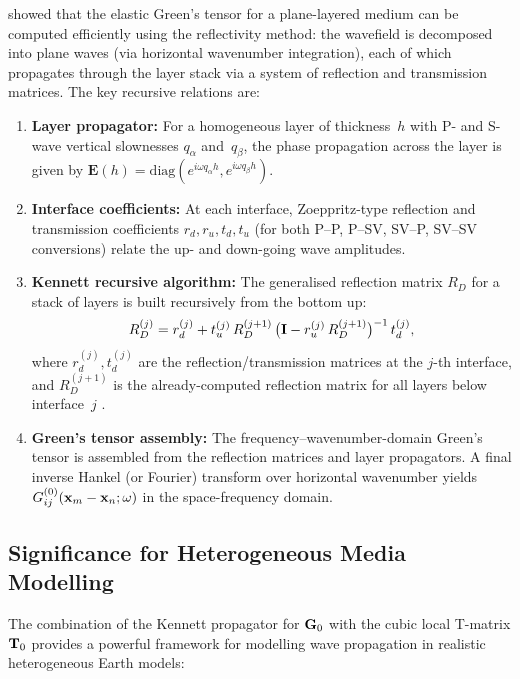 \citet{Kennett1983} showed that the elastic Green's tensor for a
plane-layered medium can be computed efficiently using the reflectivity
method: the wavefield is decomposed into plane waves (via horizontal
wavenumber integration), each of which propagates through the layer stack
via a system of reflection and transmission matrices.  The key recursive
relations are:

\begin{enumerate}
\item \textbf{Layer propagator:}  For a homogeneous layer of thickness~$h$
  with P- and S-wave vertical slownesses $q_\alpha$ and~$q_\beta$, the
  phase propagation across the layer is given by
  $\mathbf{E}(h) = \mathrm{diag}(e^{i\omega q_\alpha h},
  e^{i\omega q_\beta h})$.

\item \textbf{Interface coefficients:}  At each interface, Zoeppritz-type
  reflection and transmission coefficients $r_d, r_u, t_d, t_u$ (for both
  P--P, P--SV, SV--P, SV--SV conversions) relate the up- and down-going
  wave amplitudes.

\item \textbf{Kennett recursive algorithm:}  The generalised reflection
  matrix $R_D$ for a stack of layers is built recursively from the bottom
  up:
\begin{equation}
  R_D^{(j)} = r_d^{(j)}
  + t_u^{(j)}\,R_D^{(j+1)}\,
    \bigl(\mathbf{I} - r_u^{(j)}\,R_D^{(j+1)}\bigr)^{-1}\,t_d^{(j)},
\label{eq:Kennett}
\end{equation}
where $r_d^{(j)}, t_d^{(j)}$ are the reflection/transmission matrices at
the $j$-th interface, and $R_D^{(j+1)}$ is the already-computed reflection
matrix for all layers below interface~$j$ \citep{Kennett1983,Kennett1979}.

\item \textbf{Green's tensor assembly:}  The frequency--wavenumber-domain
  Green's tensor is assembled from the reflection matrices and layer
  propagators.  A final inverse Hankel (or Fourier) transform over
  horizontal wavenumber yields
  $G_{ij}^{(0)}(\mathbf{x}_m-\mathbf{x}_n;\omega)$ in the space-frequency domain.
\end{enumerate}

\subsection{Significance for Heterogeneous Media Modelling}

The combination of the Kennett propagator for $\mathbf{G}_0$ with the cubic local
T-matrix $\mathbf{T}_0$ provides a powerful framework for modelling wave
propagation in realistic heterogeneous Earth models:

